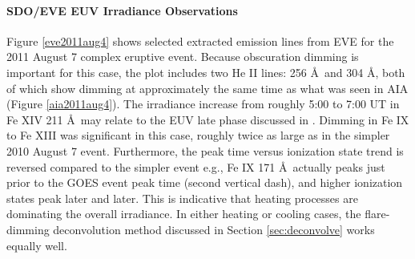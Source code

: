 \paragraph{SDO/EVE EUV Irradiance Observations}
Figure \ref{eve2011aug4} shows selected extracted emission lines from EVE for the 2011 August 7 complex eruptive event. Because obscuration dimming is important for this case, the plot includes two He II lines: 256 \AA\ and 304 \AA, both of which show dimming at approximately the same time as what was seen in AIA (Figure \ref{aia2011aug4}). The irradiance increase from roughly 5:00 to 7:00 UT in Fe XIV 211 \AA\ may relate to the EUV late phase discussed in \citet{Woods2011}. Dimming in Fe IX to Fe XIII was significant in this case, roughly twice as large as in the simpler 2010 August 7 event. Furthermore, the peak time versus ionization state trend is reversed compared to the simpler event e.g., Fe IX 171 \AA\ actually peaks just prior to the GOES event peak time (second vertical dash), and higher ionization states peak later and later. This is indicative that heating processes are dominating the overall irradiance. In either heating or cooling cases, the flare-dimming deconvolution method discussed in Section \ref{sec:deconvolve} works equally well. 

